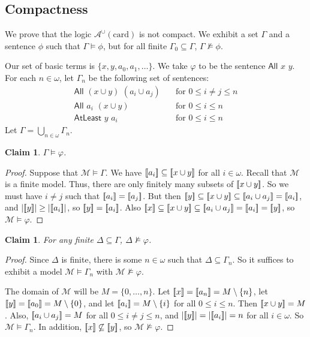 \documentclass[letterpaper]{article}
\newtheorem{claim}[theorem]{Claim}
\theoremstyle{definition}
\newcommand{\semantics}[1]{[\![\mbox{\em $ #1 $\/}]\!]}
\newcommand{\Model}{\mathcal{M}}
\newcommand{\set}[1]{\{ #1 \}}
\newcommand{\Aunion}{\mathscr{A}^{\cup}}
\newcommand{\All}[2]{\mathsf{All}\,\,#1\,\,#2}
\newcommand{\Atleast}[2]{\mathsf{AtLeast}\,\,#1\,\,#2}
\newcommand{\card}{\mathrm{card}}
\begin{document}
\subsection{Compactness}

We prove that the logic $\Aunion(\card)$ is  not compact.
We exhibit a set $\Gamma$ and a sentence $\phi$
 such that
 $\Gamma\models\phi$, but for all finite $\Gamma_0\subseteq\Gamma$,
 $\Gamma\not\models\phi$. 
 
 Our set of basic terms is $\set{x,y,a_0,a_1, \ldots}$.
We take $\varphi$ to be the sentence $\All{x}{y}$. For each $n\in \omega$, let $\Gamma_n$ be the following set of sentences:
\begin{align*}
\All{(x\cup y)}{(a_i\cup a_j)}&\quad \text{for }0\leq  i\neq j\leq n\\
\All{a_i}{(x\cup y)} &\quad \text{for  } 0\leq i\leq n\\
\Atleast{y}{a_i}&\quad \text{for } 0\leq i\leq n
\end{align*}
Let $\Gamma = \bigcup_{n\in \omega} \Gamma_n$. 

\begin{claim} $\Gamma\models \varphi$. 
\end{claim}

\begin{proof}
Suppose that $\Model\models \Gamma$. We have $\semantics{a_i}\subseteq \semantics{x\cup y}$ for all $i\in \omega$.
Recall that $\Model$ is a finite model.
Thus,  there are only finitely many subsets of $\semantics{x\cup y}$.
So we must have  $i\neq j$ such that  $\semantics{a_i} = \semantics{a_j}$. But then $\semantics{y}\subseteq \semantics{x\cup y}\subseteq \semantics{a_i\cup a_j}=\semantics{a_i}$, and $|\semantics{y}| \geq |\semantics{a_i}|$, so $\semantics{y} = \semantics{a_i}$. Also $\semantics{x}\subseteq \semantics{x\cup y}\subseteq \semantics{a_i\cup a_j}=\semantics{a_i} = \semantics{y}$, so $\Model\models \varphi$. 
\end{proof}

\begin{claim} For any finite $\Delta\subseteq \Gamma$, $\Delta\not\models \varphi$. 
\end{claim}
\begin{proof}
Since $\Delta$ is finite, there is some $n\in \omega$ such that $\Delta\subseteq \Gamma_n$. So it suffices to exhibit a model $\Model\models \Gamma_n$ with $\Model\not\models \varphi$. 

The domain of $\Model$ will be $M = \{0,\dots,n\}$. Let $\semantics{x} = \semantics{a_n} = M\setminus \{n\}$, let $\semantics{y} = \semantics{a_0} = M\setminus \{0\}$, and let $\semantics{a_i} = M\setminus \{i\}$ for all $0\leq i\leq n$. Then $\semantics{x\cup y} = M$. 
Also, $\semantics{a_i\cup a_j} = M$ for all $0\leq i \ne j\leq n$, and $|\semantics{y}| = |\semantics{a_i}| = n$ for all $i\in \omega$.
So $\mathcal{M}\models \Gamma_n$. 
In addition, $\semantics{x}\not\subseteq \semantics{y}$, so $\mathcal{M}\not\models \varphi$. 
\end{proof}
\end{document}
